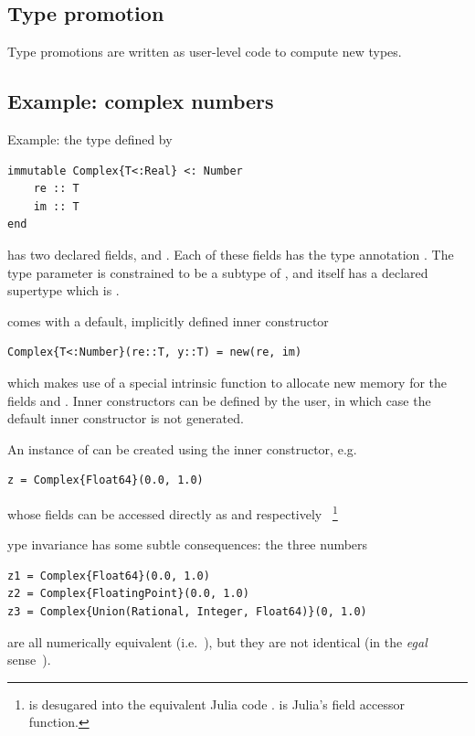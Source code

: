 \documentclass[pldi]{sigplanconf-pldi15}
\begin{document}
\subsection{Type promotion}

Type promotions are written as user-level code to compute new types.


\subsection{Example: complex numbers}

Example: the  type defined by

\begin{lstlisting}
immutable Complex{T<:Real} <: Number
    re :: T
    im :: T
end
\end{lstlisting}
%
has two declared fields,  and . Each of these fields has the
type annotation . The type parameter  is constrained to be a
subtype of , and  itself has a declared supertype
which is .

 comes with a default, implicitly defined inner constructor

\begin{lstlisting}
Complex{T<:Number}(re::T, y::T) = new(re, im)
\end{lstlisting}
%
which makes use of a special intrinsic function  to allocate new
memory for the fields  and . Inner constructors can be
defined by the user, in which case the default inner constructor is not
generated.

An instance of  can be created using the inner constructor, e.g.\

\begin{lstlisting}
z = Complex{Float64}(0.0, 1.0)
\end{lstlisting}
%
whose fields can be accessed directly as  and  respectively~
\footnote{ is desugared into the equivalent Julia code .
 is Julia's field accessor function.}

ype invariance has some subtle consequences: the three  numbers

\begin{lstlisting}
z1 = Complex{Float64}(0.0, 1.0)
z2 = Complex{FloatingPoint}(0.0, 1.0)
z3 = Complex{Union(Rational, Integer, Float64)}(0, 1.0)
\end{lstlisting}
%
are all numerically equivalent (i.e.\ ), but they are not
identical (in the \textit{egal} sense~\cite{Baker1993}).
\end{document}
